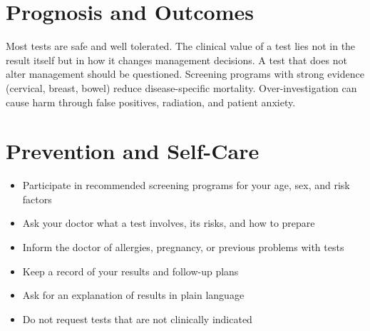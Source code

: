 \section*{Prognosis and Outcomes}
Most tests are safe and well tolerated. The clinical value of a test lies not in the result itself but in how it changes management decisions. A test that does not alter management should be questioned. Screening programs with strong evidence (cervical, breast, bowel) reduce disease-specific mortality. Over-investigation can cause harm through false positives, radiation, and patient anxiety.

\section*{Prevention and Self-Care}
\begin{itemize}
    \item Participate in recommended screening programs for your age, sex, and risk factors
    \item Ask your doctor what a test involves, its risks, and how to prepare
    \item Inform the doctor of allergies, pregnancy, or previous problems with tests
    \item Keep a record of your results and follow-up plans
    \item Ask for an explanation of results in plain language
    \item Do not request tests that are not clinically indicated
\end{itemize}

